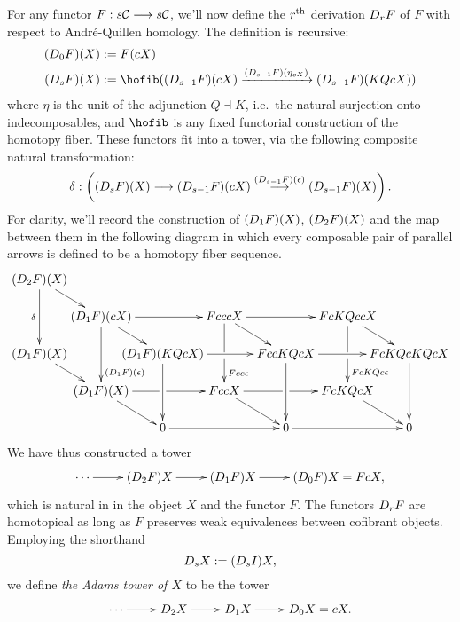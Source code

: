 \documentclass[11pt]{amsart}
\theoremstyle{plain}
\begin{document}
\newcommand{\dupdown}[2]{D_{\smash{#1}}}
\newcommand{\caldup}[1]{\calD_{\smash{#1}}}
\newcommand{\caldupdown}[2]{\calD^{\smash{#1}}_{\smash{#2}}}



For any functor $F:s\mathcal{C}\longrightarrow s\mathcal{C}$, we'll now define the $r^\textup{th}$ derivation $\dupdown{r}{b}F$ of $F$ with respect to Andr\'e-Quillen homology. The definition is recursive:
\begin{alignat*}{2}
(\dupdown{0}{b}F)(X)
&:=
F(cX)%
\\
(\dupdown{s}{b}F)(X)
&:=
\hofib((\dupdown{s-1}{c}F)(cX)\xrightarrow{(\dupdown{s-1}{c}F)(\eta_{cX})} (\dupdown{s-1}{c}F)(KQcX))
\end{alignat*}
where $\eta$ is the unit of the adjunction $Q\dashv K$, i.e.\ the natural surjection onto indecomposables, and $\hofib$ is any fixed  functorial construction of the homotopy fiber. These functors fit into a tower, via the following composite natural transformation:
\[\delta:\left((\dupdown{s}{c}F)(X)\to (\dupdown{s-1}{c}F)(cX)\overset{(\dupdown{s-1}{c}F)(\epsilon)}{\to} (\dupdown{s-1}{c}F)(X)\right).\]
For clarity, we'll record the construction of $(\dupdown{1}{c}F)(X)$, $(\dupdown{2}{c}F)(X)$ and the map between them in the following diagram in which every composable pair of parallel arrows is defined to be a homotopy fiber sequence.
\[\def\labelstyle{\scriptstyle}
\xymatrix@!0@R=30pt@C=50pt{
(\dupdown{2}{c}F)(X)\ar[dr]\ar[dd]_\delta\\
&(\dupdown{1}{c}F)(cX) \ar[rr]\ar[rd]\ar[dd]^(.75){(\dupdown{1}{c}F)(\epsilon)}         &           &FcccX \ar[rr]\ar[rd]\ar'[d][dd]^{Fcc\epsilon}         &           &   FcKQccX \ar'[d][dd]^{FcKQc\epsilon}           \ar[dr]  &                  \\
(\dupdown{1}{c}F)(X)\ar[dr]&        &  (\dupdown{1}{c}F)(KQcX) \ar[rr] \ar[dd]  &                     &  FccKQcX \ar[rr] \ar[dd]  &             & FcKQcKQcX
         \ar[dd] \\
&(\dupdown{1}{c}F)(X) \ar'[r][rr] \ar[dr] &        &   FccX \ar'[r][rr] \ar[dr] &        &   FcKQcX
\ar[dr] &                   \\
&        &   0 \ar[rr]      &               &   0 \ar[rr]      &                    &
0
}\]
We have thus constructed a tower
\[\xymatrix@R=4mm{
\cdots 
\ar[r]
&%
(\dupdown{2}{c}F)X
\ar[r]
&%
(\dupdown{1}{c}F)X
\ar[r]&%
(\dupdown{0}{c}F)X=FcX,
}\]
which is natural in in the object $X$ and the functor $F$.
The functors $\dupdown{r}{c}F$ are homotopical as long as $F$ preserves weak equivalences between cofibrant objects. Employing the shorthand
\[\dupdown{s}{c}X:=(\dupdown{s}{c}I)X,\]
we define \emph{the Adams tower of $X$} to be the tower
\[\xymatrix@R=4mm{
\cdots 
\ar[r]
&%
\dupdown{2}{c}X
\ar[r]
&%
\dupdown{1}{c}X
\ar[r]&%
\dupdown{0}{c}X=cX.
}\]
\end{document}
